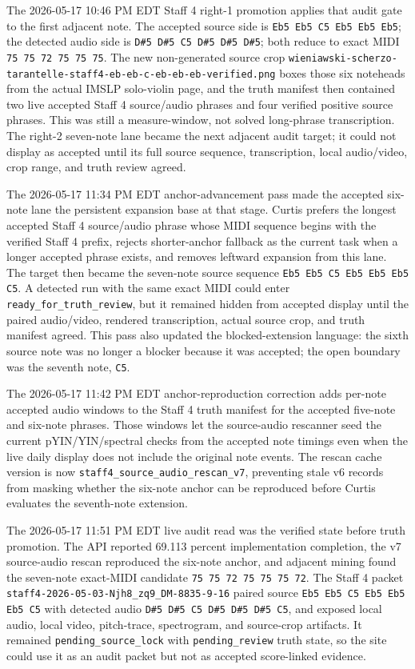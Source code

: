 \documentclass[12pt,letterpaper]{article}
\begin{document}
The 2026-05-17 10:46 PM EDT Staff 4 right-1 promotion applies that audit gate to the first adjacent note. The accepted source side is \texttt{Eb5 Eb5 C5 Eb5 Eb5 Eb5}; the detected audio side is \texttt{D\#5 D\#5 C5 D\#5 D\#5 D\#5}; both reduce to exact MIDI \texttt{75 75 72 75 75 75}. The new non-generated source crop \texttt{wieniawski-scherzo-tarantelle-staff4-eb-eb-c-eb-eb-eb-verified.png} boxes those six noteheads from the actual IMSLP solo-violin page, and the truth manifest then contained two live accepted Staff 4 source/audio phrases and four verified positive source phrases. This was still a measure-window, not solved long-phrase transcription. The right-2 seven-note lane became the next adjacent audit target; it could not display as accepted until its full source sequence, transcription, local audio/video, crop range, and truth review agreed.

The 2026-05-17 11:34 PM EDT anchor-advancement pass made the accepted six-note lane the persistent expansion base at that stage. Curtis prefers the longest accepted Staff 4 source/audio phrase whose MIDI sequence begins with the verified Staff 4 prefix, rejects shorter-anchor fallback as the current task when a longer accepted phrase exists, and removes leftward expansion from this lane. The target then became the seven-note source sequence \texttt{Eb5 Eb5 C5 Eb5 Eb5 Eb5 C5}. A detected run with the same exact MIDI could enter \texttt{ready\_for\_truth\_review}, but it remained hidden from accepted display until the paired audio/video, rendered transcription, actual source crop, and truth manifest agreed. This pass also updated the blocked-extension language: the sixth source note was no longer a blocker because it was accepted; the open boundary was the seventh note, \texttt{C5}.

The 2026-05-17 11:42 PM EDT anchor-reproduction correction adds per-note accepted audio windows to the Staff 4 truth manifest for the accepted five-note and six-note phrases. Those windows let the source-audio rescanner seed the current pYIN/YIN/spectral checks from the accepted note timings even when the live daily display does not include the original note events. The rescan cache version is now \texttt{staff4\_source\_audio\_rescan\_v7}, preventing stale v6 records from masking whether the six-note anchor can be reproduced before Curtis evaluates the seventh-note extension.

The 2026-05-17 11:51 PM EDT live audit read was the verified state before truth promotion. The API reported 69.113 percent implementation completion, the v7 source-audio rescan reproduced the six-note anchor, and adjacent mining found the seven-note exact-MIDI candidate \texttt{75 75 72 75 75 75 72}. The Staff 4 packet \texttt{staff4-2026-05-03-Njh8\_zq9\_DM-8835-9-16} paired source \texttt{Eb5 Eb5 C5 Eb5 Eb5 Eb5 C5} with detected audio \texttt{D\#5 D\#5 C5 D\#5 D\#5 D\#5 C5}, and exposed local audio, local video, pitch-trace, spectrogram, and source-crop artifacts. It remained \texttt{pending\_source\_lock} with \texttt{pending\_review} truth state, so the site could use it as an audit packet but not as accepted score-linked evidence.
\end{document}
